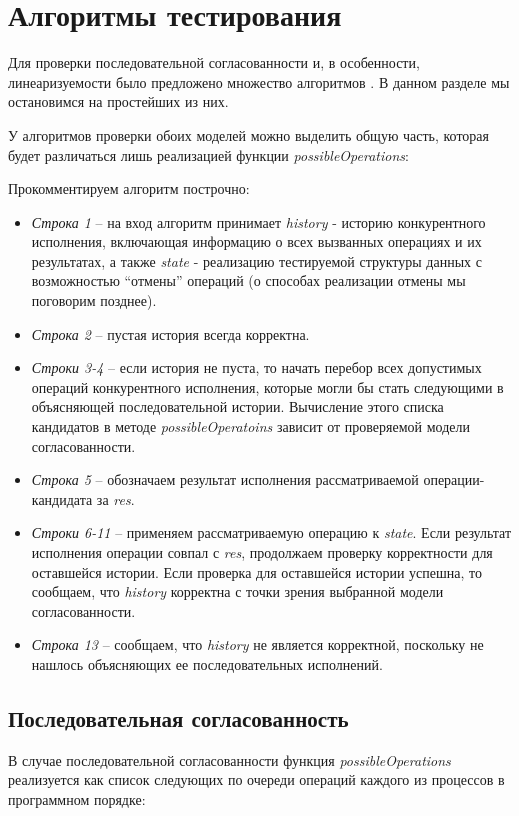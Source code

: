 \documentclass[14pt, openany]{book}
\begin{document}
\section{Алгоритмы тестирования}
Для проверки последовательной согласованности и, в особенности, линеаризуемости было предложено множество алгоритмов \cite{checkAlgorithms}. В данном разделе мы остановимся на простейших из них. \par
У алгоритмов проверки обоих моделей можно выделить общую часть, которая будет различаться лишь реализацией функции \textit{possibleOperations}: 

Прокомментируем алгоритм построчно:
\begin{itemize}
    \item \emph{Строка 1} -- на вход алгоритм принимает \emph{history} - историю конкурентного исполнения, включающая информацию о всех вызванных операциях и их результатах, а также \emph{state} - реализацию тестируемой структуры данных с возможностью ``отмены'' операций (о способах реализации отмены мы поговорим позднее).
    \item \emph{Строка 2} -- пустая история всегда корректна.
    \item \emph{Строки 3-4} -- если история не пуста, то начать перебор всех допустимых операций конкурентного исполнения, которые могли бы стать следующими в объясняющей последовательной истории. Вычисление этого списка кандидатов в методе \emph{possibleOperatoins} зависит от проверяемой модели согласованности.
    \item \emph{Строка 5} -- обозначаем результат исполнения рассматриваемой операции-кандидата за \emph{res}.
    \item \emph{Строки 6-11} -- применяем рассматриваемую операцию к \emph{state}. Если результат исполнения операции совпал с \emph{res}, продолжаем проверку корректности для оставшейся истории. Если проверка для оставшейся истории успешна, то сообщаем, что \emph{history} корректна с точки зрения выбранной модели согласованности.
    \item \emph{Строка 13} -- сообщаем, что \emph{history} не является корректной, поскольку не нашлось объясняющих ее последовательных исполнений.
\end{itemize}
\subsection{Последовательная согласованность}
В случае последовательной согласованности функция \emph{possibleOperations} реализуется как список следующих по очереди операций каждого из процессов в программном порядке:

\end{document}
